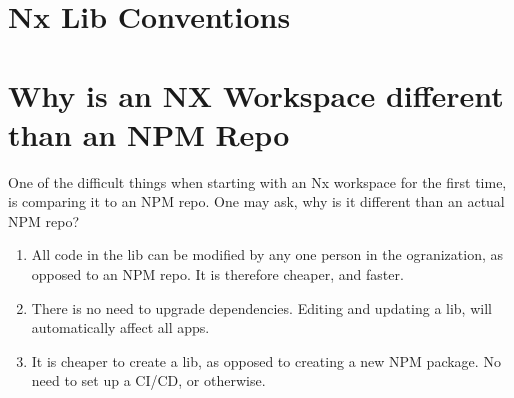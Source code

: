 \maketitle{}
\section{ Nx Lib Conventions }

\section{ Why is an NX Workspace different than an NPM Repo }
One of the difficult things when starting with an Nx workspace for the first
time, is comparing it to an NPM repo. One may ask, why is it different than an
actual NPM repo?

\begin{enumerate}
  \item All code in the lib can be modified by any one person in the
  ogranization, as opposed to an NPM repo. It is therefore cheaper, and faster.
  \item There is no need to upgrade dependencies. Editing and updating a lib,
  will automatically affect all apps.
  \item It is cheaper to create a lib, as opposed to creating a new NPM package.
  No need to set up a CI/CD, or otherwise.
\end{enumerate}
